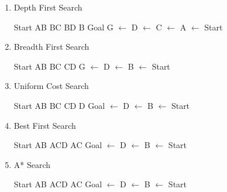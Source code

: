 \documentclass[12pt]{article}
\begin{document}
\begin{enumerate}

\item Depth First Search
\begin{solution}
Start \newline
AB \newline
BC \newline
BD \newline
B Goal \newline
G $\leftarrow$ D $\leftarrow$ C $\leftarrow$ A $\leftarrow$ Start
\end{solution}

\item Breadth First Search
\begin{solution}
Start \newline
AB \newline
BC \newline
CD \newline
G $\leftarrow$ D $\leftarrow$ B $\leftarrow$ Start
\end{solution}

\item Uniform Cost Search
\begin{solution}
Start \newline
AB \newline
BC \newline
CD \newline
D \newline
Goal $\leftarrow$ D $\leftarrow$ B $\leftarrow$ Start
\end{solution}

\item Best First Search
\begin{solution}
Start \newline 
AB \newline
ACD \newline
AC  \newline
Goal $\leftarrow$ D $\leftarrow$ B $\leftarrow$ Start
\end{solution}

\item A* Search
\begin{solution}
Start \newline
AB  \newline
ACD \newline
AC \newline
Goal $\leftarrow$ D  $\leftarrow$ B  $\leftarrow$ Start
\end{solution}

\end{enumerate}
\end{document}
